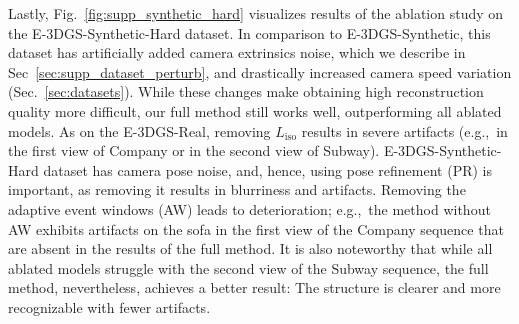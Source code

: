Lastly, Fig.~\ref{fig:supp_synthetic_hard} visualizes results of the ablation study on the E-3DGS-Synthetic-Hard dataset. 
In comparison to E-3DGS-Synthetic, this dataset has artificially added camera extrinsics noise, which we describe in Sec~\ref{sec:supp_dataset_perturb}, and drastically increased camera speed variation (Sec.~\ref{sec:datasets}). 
While these changes make obtaining high reconstruction quality more difficult, our full method still works well, outperforming all ablated models. 
As on the E-3DGS-Real, removing $L_\text{iso}$ results in severe artifacts (e.g.,~in the first view of Company or in the second view of Subway). 
E-3DGS-Synthetic-Hard dataset has camera pose noise, and, hence, using pose refinement (PR) is important, as removing it results in blurriness and artifacts. 
Removing the adaptive event windows (AW) leads to deterioration; e.g.,~the method without AW exhibits artifacts on the sofa in the first view of the Company sequence that are absent in the results of the full method. 
It is also noteworthy that while all ablated models struggle with the second view of the Subway sequence, the full method, nevertheless,  achieves a better result: The structure is clearer and more recognizable with fewer artifacts. 

